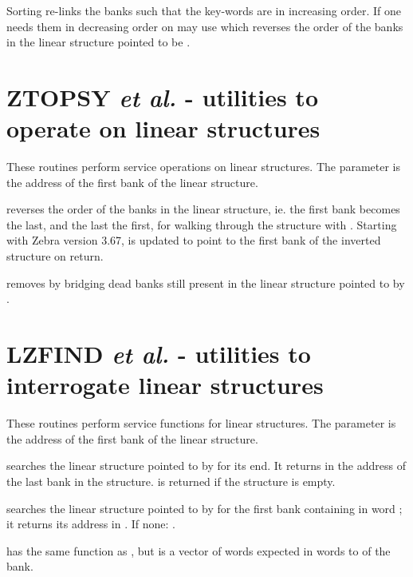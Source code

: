 Sorting re-links the banks such that the key-words are in
increasing order.
If one needs them in decreasing order on may use
which reverses the order of the banks in the linear structure
pointed to be .

\section{ZTOPSY {\it et al.} - utilities to operate on linear structures}

These routines perform service operations
on linear structures.
The parameter  is the address of the first bank
of the linear structure.



reverses the order of the banks in the linear structure,
ie. the first bank becomes the last, and the last the first,
for walking through the structure with .
Starting with Zebra version 3.67,  is updated to point to
the first bank of the inverted structure on return.


removes by bridging dead banks still present
in the linear structure pointed to by .

\section{LZFIND {\it et al.} - utilities to interrogate linear structures}

These routines perform service functions for linear structures.
The parameter  is the address of the first bank
of the linear structure.


searches the linear structure pointed to by  for its end.
It returns in  the address of the last bank in the structure.
 is returned if the structure is empty.


searches the linear structure pointed to by 
for the first bank containing  in word ;
it returns its address in .
If none:  .


has the same function as ,
but  is a vector of  words expected
in words  to  of the bank.

